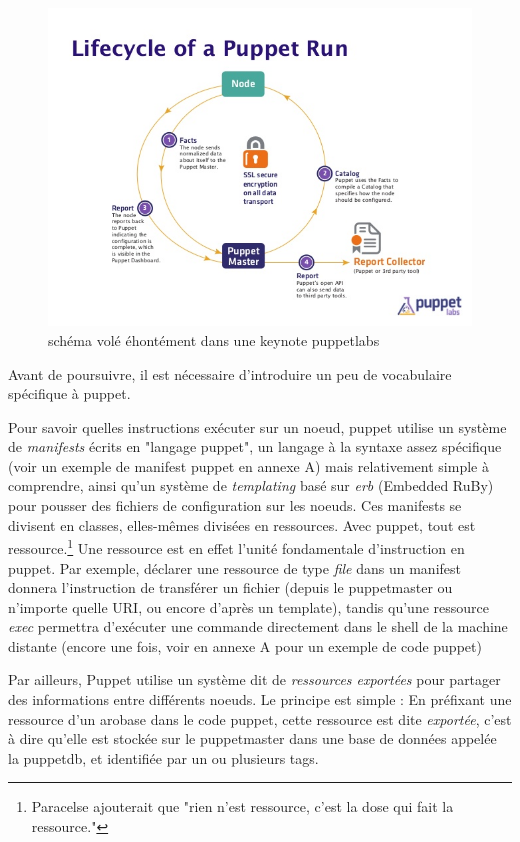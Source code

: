 \documentclass[14 pt,a4paper]{extreport}
\begin{document}
\begin{figure}[H]
\centering
\includegraphics[scale=0.70]{puppetrun.jpg}
\caption{schéma volé éhontément dans une keynote puppetlabs}
\label{}
\end{figure}

Avant de poursuivre, il est nécessaire d'introduire un peu de vocabulaire spécifique à puppet.

Pour savoir quelles instructions exécuter sur un noeud, puppet utilise un système de \emph{manifests} écrits en "langage puppet", un langage à la syntaxe assez spécifique (voir un exemple de manifest puppet en annexe A) mais relativement simple à comprendre, ainsi qu'un système de \emph{templating} basé sur \emph{erb} (Embedded RuBy) pour pousser des fichiers de configuration sur les noeuds. Ces manifests se divisent en classes, elles-mêmes divisées en ressources. Avec puppet, tout est ressource.\footnote{Paracelse ajouterait que "rien n'est ressource, c'est la dose qui fait la ressource."} Une ressource est en effet l'unité fondamentale d'instruction en puppet. Par exemple, déclarer une ressource de type \emph{file} dans un manifest donnera l'instruction de transférer un fichier (depuis le puppetmaster ou n'importe quelle URI, ou encore d'après un template), tandis qu'une ressource \emph{exec} permettra d'exécuter une commande directement dans le shell de la machine distante (encore une fois, voir en annexe A pour un exemple de code puppet)

Par ailleurs, Puppet utilise un système dit de \emph{ressources exportées} pour partager des informations entre différents noeuds. Le principe est simple : En préfixant une ressource d'un arobase dans le code puppet, cette ressource est dite \emph{exportée}, c'est à dire qu'elle est stockée sur le puppetmaster dans une base de données appelée la puppetdb, et identifiée par un ou plusieurs tags.
\end{document}
